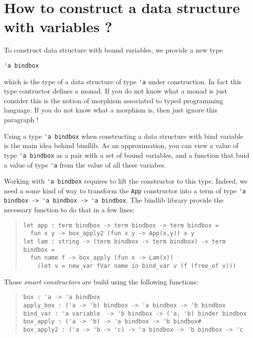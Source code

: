 \documentclass[11pt]{article}
\begin{document}
\section{How to construct a data structure with variables ?}

To construct data structure with bound variables, we provide a new type
\begin{center}
\verb!'a bindbox!
\end{center}

which is the type of a data structure of type \verb#'a# under
construction.
In fact this type contructor defines a monad. If you do not know what
a monad is just consider this is the notion of morphism associated to
typed programming language. If you do not know what a morphism is,
then just ignore this paragraph !

Using a type \verb!'a bindbox! when constructing a data structure with
bind variable is the main idea behind bindlib. As an approximation,
you can view a value of type \verb!'a bindbox! as a pair with a set
of bound variables, and a function that buid a value of type \verb!'a!
from the value of all these variabes.

Working with \verb!'a bindbox! requires to lift the constructor to
this type. Indeed, we need a some kind of way to transform the
\verb!App! constructor into a term of type
\verb!'a bindbox -> 'a bindbox -> 'a bindbox!. The bindlib library
provide the necessary function to do that in a few lines:

\begin{quote}
\begin{verbatim}
let app : term bindbox -> term bindbox -> term bindbox =
  fun x y -> box_apply2 (fun x y -> App(x,y)) x y
let lam : string -> (term bindbox -> term bindbox) -> term bindbox =
  fun name f -> box_apply (fun x -> Lam(x))
    (let v = new_var fVar name in bind_var v (f (free_of v)))
\end{verbatim}
\end{quote}

Those \emph{smart constructors} are build using the following functions:
\begin{quote}
\begin{verbatim}
box : 'a -> 'a bindbox
apply_box : ('a -> 'b) bindbox -> 'a bindbox -> 'b bindbox
bind_var : 'a variable  -> 'b bindbox -> ('a, 'b) binder bindbox
box_apply : ('a -> 'b) -> 'a bindbox -> 'b bindbox#
box_apply2 : ('a -> 'b -> 'c) -> 'a bindbox -> 'b bindbox -> 'c
\end{verbatim}
\end{quote}
\end{document}
